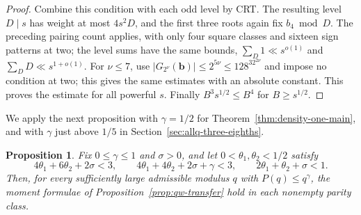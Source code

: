 \documentclass[12pt, a4paper]{amsart}
\numberwithin{equation}{section}
\renewcommand{\le}{\leqslant}
\renewcommand{\ge}{\geqslant}
\theoremstyle{plain}
\newtheorem{prop}[lem]{Proposition}
\begin{document}
\begin{proof}
Combine this condition with each odd level by CRT. The resulting level $D\mid s$ has weight at most $4s^2D$, and the first three roots again fix $b_4\bmod D$. The preceding pairing count applies, with only four square classes and sixteen sign patterns at two; the level sums have the same bounds, $\sum_D1\ll s^{o(1)}$ and $\sum_DD\ll s^{1+o(1)}$. For $\nu\le7$, use $|G_{2^\nu}(\mathbf b)|\le2^{5\nu}\le128^32^{2\nu}$ and impose no condition at two; this gives the same estimates with an absolute constant. This proves the estimate for all powerful $s$. Finally $B^3s^{1/2}\le B^4$ for $B\ge s^{1/2}$.
\end{proof}

We apply the next proposition with $\gamma=1/2$ for Theorem~\ref{thm:density-one-main}, and with $\gamma$ just above $1/5$ in Section~\ref{sec:allq-three-eighths}.

\begin{prop}\label{prop:small-nsf-moment}
Fix $0\le\gamma\le1$ and $\sigma>0$, and let $0<\theta_1,\theta_2<1/2$ satisfy
$$
4\theta_1+6\theta_2+2\sigma<3,\qquad
4\theta_1+4\theta_2+2\sigma+\gamma<3,\qquad
2\theta_1+\theta_2+\sigma<1.
$$
Then, for every sufficiently large admissible modulus $q$ with $P(q)\le q^\gamma$, the moment formulae of Proposition~\ref{prop:qw-transfer} hold in each nonempty parity class.
\end{prop}
\end{document}
